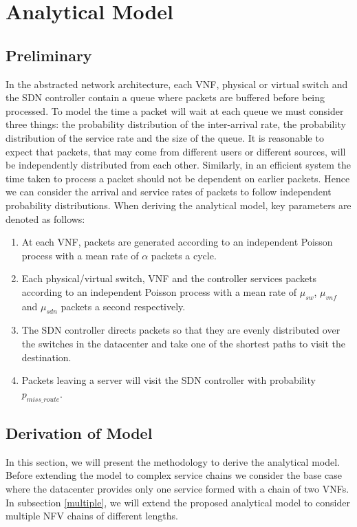 
\section{Analytical Model}
\label{sec:analytical_model}
\subsection{Preliminary}
In the abstracted network architecture, each VNF, physical or virtual switch and the SDN controller contain a queue where packets are buffered before being processed. To model the time a packet will wait at each queue we must consider three things: the probability distribution of the inter-arrival rate, the probability distribution of the service rate and the size of the queue. It is reasonable to expect that packets, that may come from different users or different sources, will be independently distributed from each other. Similarly, in an efficient system the time taken to process a packet should not be dependent on earlier packets. Hence we can consider the arrival and service rates of packets to follow independent probability distributions. When deriving the analytical model, key parameters are denoted as follows:
\begin{enumerate}
\item At each VNF, packets are generated according to an independent Poisson process with a mean rate of $\alpha$ packets a cycle. 
\item Each physical/virtual switch, VNF and the controller services packets according to an independent Poisson process with a mean rate of $\mu_{sw}$, $\mu_{vnf}$ and $\mu_{sdn}$ packets a second respectively.
\item The SDN controller directs packets so that they are evenly distributed over the switches in the datacenter and take one of the shortest paths to visit the destination.
\item Packets leaving a server will visit the SDN controller with probability $p_{miss\_route}$.
\end{enumerate}

\subsection{Derivation of Model}
In this section, we will present the methodology to derive the analytical model. Before extending the model to complex service chains we consider the base case where the datacenter provides only one service formed with a chain of two VNFs. In subsection \ref{multiple}, we will extend the proposed analytical model to consider multiple NFV chains of different lengths. 

